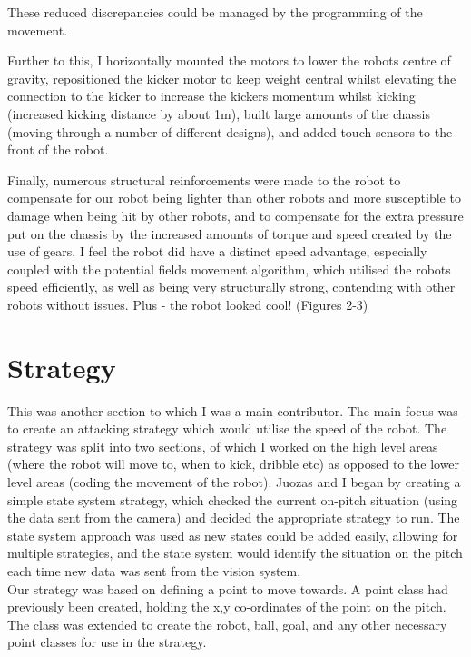 \documentclass[12pt]{IEEEtran}
\begin{document}
These reduced discrepancies could be managed by the programming of the movement. \linebreak

Further to this, I horizontally mounted the motors to lower the robots centre of gravity, repositioned the kicker motor to keep weight central whilst elevating the connection to the kicker to increase the kickers momentum whilst kicking (increased kicking distance by about 1m), built large amounts of the chassis (moving through a number of different designs), and added touch sensors to the front of the robot. \linebreak

Finally, numerous structural reinforcements were made to the robot to compensate for our robot being lighter than other robots and more susceptible to damage when being hit by other robots, and to compensate for the extra pressure put on the chassis by the increased amounts of torque and speed created by the use of gears. I feel the robot did have a distinct speed advantage, especially coupled with the potential fields movement algorithm, which utilised the robots speed efficiently, as well as being very structurally strong, contending with other robots without issues. Plus - the robot looked cool! (Figures 2-3)

\section{Strategy}

This was another section to which I was a main contributor. The main focus was to create an attacking strategy which would utilise the speed of the robot. The strategy was split into two sections, of which I worked on the high level areas (where the robot will move to, when to kick, dribble etc) as opposed to the lower level areas (coding the movement of the robot). Juozas and I began by creating a simple state system strategy, which checked the current on-pitch situation (using the data sent from the camera) and decided the appropriate strategy to run. The state system approach was used as new states could be added easily, allowing for multiple strategies, and the state system would identify the situation on the pitch each time new data was sent from the vision system. \\

Our strategy was based on defining a point to move towards. A point class had previously been created, holding the x,y co-ordinates of the point on the pitch. The class was extended to create the robot, ball, goal, and any other necessary point classes for use in the strategy. 
\end{document}
